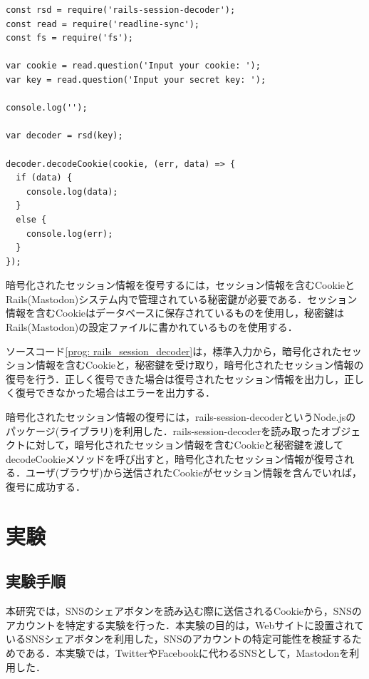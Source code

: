 \documentclass[10pt, a4paper]{jreport}
\begin{document}
\begin{lstlisting}[caption=Railsセッションデコーダ,label=prog: rails_session_decoder]
const rsd = require('rails-session-decoder');
const read = require('readline-sync');
const fs = require('fs');

var cookie = read.question('Input your cookie: ');
var key = read.question('Input your secret key: ');

console.log('');

var decoder = rsd(key);

decoder.decodeCookie(cookie, (err, data) => {
  if (data) {
    console.log(data);
  }
  else {
    console.log(err);
  }
});
\end{lstlisting}

暗号化されたセッション情報を復号するには，セッション情報を含むCookieとRails(Mastodon)システム内で管理されている秘密鍵が必要である．セッション情報を含むCookieはデータベースに保存されているものを使用し，秘密鍵はRails(Mastodon)の設定ファイルに書かれているものを使用する．

ソースコード\ref{prog: rails_session_decoder}は，標準入力から，暗号化されたセッション情報を含むCookieと，秘密鍵を受け取り，暗号化されたセッション情報の復号を行う．正しく復号できた場合は復号されたセッション情報を出力し，正しく復号できなかった場合はエラーを出力する．

暗号化されたセッション情報の復号には，rails-session-decoderというNode.jsのパッケージ(ライブラリ)を利用した\cite{npm_rails_session_decoder}．rails-session-decoderを読み取ったオブジェクトに対して，暗号化されたセッション情報を含むCookieと秘密鍵を渡してdecodeCookieメソッドを呼び出すと，暗号化されたセッション情報が復号される．ユーザ(ブラウザ)から送信されたCookieがセッション情報を含んでいれば，復号に成功する．






\chapter{実験}
\section{実験手順}
本研究では，SNSのシェアボタンを読み込む際に送信されるCookieから，SNSのアカウントを特定する実験を行った．本実験の目的は，Webサイトに設置されているSNSシェアボタンを利用した，SNSのアカウントの特定可能性を検証するためである．本実験では，TwitterやFacebookに代わるSNSとして，Mastodonを利用した．
\end{document}
